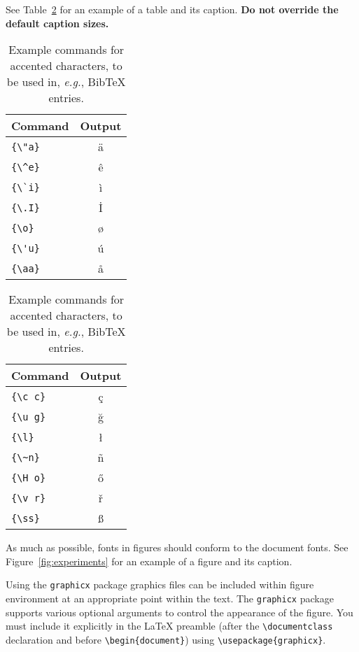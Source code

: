 \documentclass[11pt]{article}
\begin{document}
See Table~\ref{tab:accents} for an example of a table and its caption.
\textbf{Do not override the default caption sizes.}

\begin{table}
  \centering
  \begin{tabular}{lc}
    \hline
    \textbf{Command} & \textbf{Output} \\
    \hline
    \verb|{\"a}|     & {\"a}           \\
    \verb|{\^e}|     & {\^e}           \\
    \verb|{\`i}|     & {\`i}           \\
    \verb|{\.I}|     & {\.I}           \\
    \verb|{\o}|      & {\o}            \\
    \verb|{\'u}|     & {\'u}           \\
    \verb|{\aa}|     & {\aa}           \\\hline
  \end{tabular}
  \begin{tabular}{lc}
    \hline
    \textbf{Command} & \textbf{Output} \\
    \hline
    \verb|{\c c}|    & {\c c}          \\
    \verb|{\u g}|    & {\u g}          \\
    \verb|{\l}|      & {\l}            \\
    \verb|{\~n}|     & {\~n}           \\
    \verb|{\H o}|    & {\H o}          \\
    \verb|{\v r}|    & {\v r}          \\
    \verb|{\ss}|     & {\ss}           \\
    \hline
  \end{tabular}
  \caption{Example commands for accented characters, to be used in, \emph{e.g.}, Bib\TeX{} entries.}
  \label{tab:accents}
\end{table}

As much as possible, fonts in figures should conform
to the document fonts. See Figure~\ref{fig:experiments} for an example of a figure and its caption.

Using the \verb|graphicx| package graphics files can be included within figure
environment at an appropriate point within the text.
The \verb|graphicx| package supports various optional arguments to control the
appearance of the figure.
You must include it explicitly in the \LaTeX{} preamble (after the
\verb|\documentclass| declaration and before \verb|\begin{document}|) using
\verb|\usepackage{graphicx}|.
\end{document}
